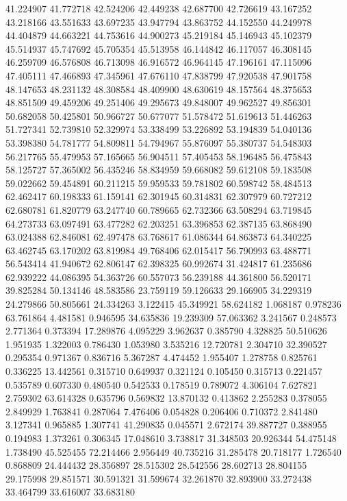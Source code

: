 41.224907
41.772718
42.524206
42.449238
42.687700
42.726619
43.167252
43.218166
43.551633
43.697235
43.947794
43.863752
44.152550
44.249978
44.404879
44.663221
44.753616
44.900273
45.219184
45.146943
45.102379
45.514937
45.747692
45.705354
45.513958
46.144842
46.117057
46.308145
46.259709
46.576808
46.713098
46.916572
46.964145
47.196161
47.115096
47.405111
47.466893
47.345961
47.676110
47.838799
47.920538
47.901758
48.147653
48.231132
48.308584
48.409900
48.630619
48.157564
48.375653
48.851509
49.459206
49.251406
49.295673
49.848007
49.962527
49.856301
50.682058
50.425801
50.966727
50.677077
51.578472
51.619613
51.446263
51.727341
52.739810
52.329974
53.338499
53.226892
53.194839
54.040136
53.398380
54.781777
54.809811
54.794967
55.876097
55.380737
54.548303
56.217765
55.479953
57.165665
56.904511
57.405453
58.196485
56.475843
58.125727
57.365002
56.435246
58.834959
59.668082
59.612108
59.183508
59.022662
59.454891
60.211215
59.959533
59.781802
60.598742
58.484513
62.462417
60.198333
61.159141
62.301945
60.314831
62.307979
60.727212
62.680781
61.820779
63.247740
60.789665
62.732366
63.508294
63.719845
64.273733
63.097491
63.477282
62.203251
63.396853
62.387135
63.868490
63.024388
62.846081
62.497478
63.768617
61.086344
64.863873
64.340225
63.462745
63.170202
63.819984
49.768406
62.015417
56.790993
63.488771
56.543414
41.940672
62.806147
62.398325
60.992674
31.424817
61.235686
62.939222
44.086395
54.363726
60.557073
56.239188
44.361800
56.520171
39.825284
50.134146
48.583586
23.759119
59.126633
29.166905
34.229319
24.279866
50.805661
24.334263
3.122415
45.349921
58.624182
1.068187
0.978236
63.761864
4.481581
0.946595
34.635836
19.239309
57.063362
3.241567
0.248573
2.771364
0.373394
17.289876
4.095229
3.962637
0.385790
4.328825
50.510626
1.951935
1.322003
0.786430
1.053980
3.535216
12.720781
2.304710
32.390527
0.295354
0.971367
0.836716
5.367287
4.474452
1.955407
1.278758
0.825761
0.336225
13.442561
0.315710
0.649937
0.321124
0.105450
0.315713
0.221457
0.535789
0.607330
0.480540
0.542533
0.178519
0.789072
4.306104
7.627821
2.759302
63.614328
0.635796
0.569832
13.870132
0.413862
2.255283
0.378055
2.849929
1.763841
0.287064
7.476406
0.054828
0.206406
0.710372
2.841480
3.127341
0.965885
1.307741
41.290835
0.045571
2.672174
39.887727
0.388955
0.194983
1.373261
0.306345
17.048610
3.738817
31.348503
20.926344
54.475148
1.738490
45.525455
72.214466
2.956449
40.735216
31.285478
20.718177
1.726540
0.868809
24.444432
28.356897
28.515302
28.542556
28.602713
28.804155
29.175998
29.851571
30.591321
31.599674
32.261870
32.893900
33.272438
33.464799
33.616007
33.683180

